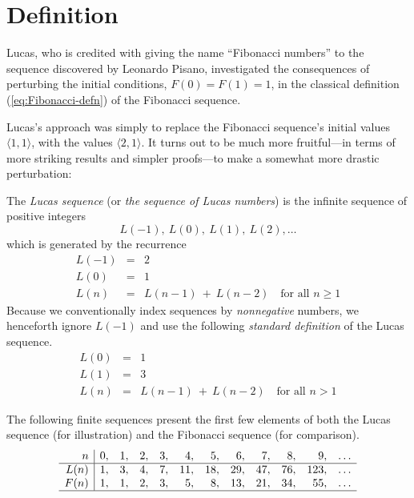 \section{Definition}

Lucas, who is credited with giving the name ``Fibonacci numbers'' to the sequence discovered by Leonardo Pisano, investigated the consequences of perturbing the initial conditions, $F(0) = F(1) = 1$, in the classical definition (\ref{eq:Fibonacci-defn}) of the Fibonacci sequence.

\medskip

Lucas's approach was simply to replace the Fibonacci sequence's initial values $\langle 1,1 \rangle$, with the values $\langle 2,1 \rangle$.  It turns out to be much more fruitful---in terms of more striking results and simpler proofs---to make a somewhat more drastic perturbation:

\smallskip


The {\it Lucas sequence} (or {\it the sequence of Lucas numbers}) is the infinite sequence of positive integers
\[ L(-1), \ L(0), \ L(1), \ L(2), \ldots \]
which is generated by the recurrence
\begin{eqnarray}
\nonumber
L(-1) & = & 2 \\
\label{eq:Lucas-defn-1}
L(0) & = & 1 \\
\nonumber
L(n) & = & L(n-1) \ + \ L(n-2) \ \ \ \mbox{ for all } n \geq 1
\end{eqnarray}
Because we conventionally index sequences by {\em nonnegative} numbers, we henceforth ignore $L(-1)$ and use the following {\em standard definition} of the Lucas sequence.
\begin{eqnarray}
\nonumber
L(0) & = & 1 \\
\label{eq:Lucas-defn-2}
L(1) & = & 3 \\
\nonumber
L(n) & = & L(n-1) \ + \ L(n-2) \ \ \ \mbox{ for all } n > 1
\end{eqnarray}

\medskip

The following finite sequences present the first few elements of both the Lucas sequence (for illustration) and the Fibonacci sequence (for comparison).
\[
\begin{array}{r|rrrrrrrrrrr}
n &
 0, & 1, & 2, & 3, &  4, &  5, &  6, &  7, &  8, &   9, & \ldots \\
\hline
L(n) &
 1, & 3, & 4, & 7, & 11, & 18, & 29, & 47, & 76, & 123, & \ldots \\
F(n) &
 1, & 1, & 2, & 3, &  5, &  8, & 13, & 21, & 34, &  55, & \ldots \\
\hline
\end{array}
\]

